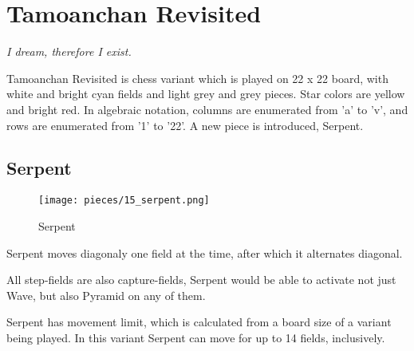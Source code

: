 

\chapter*{Tamoanchan Revisited}
\label{ch:Tamoanchan Revisited}

\begin{flushright}
\parbox{0.6\textwidth}{
\emph{I dream, therefore I exist. \\
 } }
\end{flushright}

\noindent
Tamoanchan Revisited is chess variant which is played on 22 x 22 board,
with white and bright cyan fields and light grey and grey pieces.
Star colors are yellow and bright red. In algebraic notation, columns
are enumerated from 'a' to 'v', and rows are enumerated from '1' to '22'.
A new piece is introduced, Serpent.

\clearpage %

\section*{Serpent}
\label{sec:Tamoanchan Revisited/Serpent}

\noindent
\begin{wrapfigure}[11]{l}{0.4\textwidth}
\centering
\texttt{[image: pieces/15\_serpent.png]}
\caption{Serpent}
\label{fig:15_serpent}
\end{wrapfigure}
Serpent moves diagonaly one field at the time, after which it alternates
diagonal.

All step-fields are also capture-fields, Serpent would be able to activate
not just Wave, but also Pyramid on any of them.

Serpent has movement limit, which is calculated from a board size of a variant
being played. In this variant Serpent can move for up to 14 fields, inclusively.

